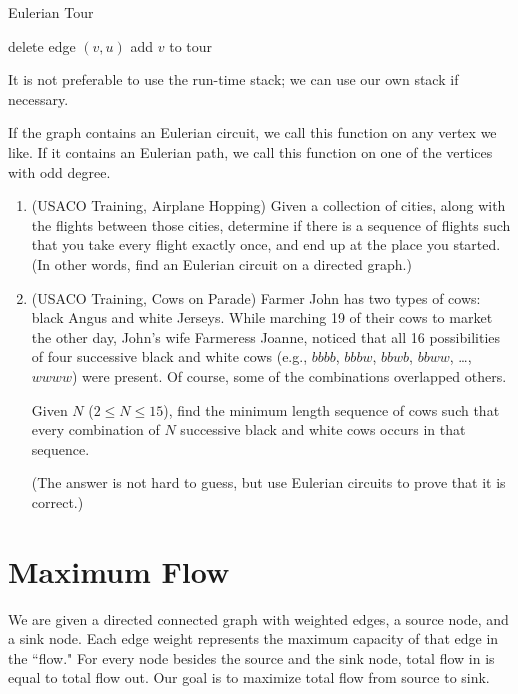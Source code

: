\documentclass[11pt]{book}
\begin{document}
\begin{algorithm}
\caption{Eulerian Tour}
\begin{algorithmic}
	\State delete edge $(v,u)$
	\State {}
\EndWhile
\State add $v$ to tour
\EndFunction
\end{algorithmic}
\end{algorithm}

It is not preferable to use the run-time stack; we can use our own stack if necessary.

If the graph contains an Eulerian circuit, we call this function on any vertex we like. If it contains an Eulerian path, we call this function on one of the vertices with odd degree.

\begin{enumerate}

\item
(USACO Training, Airplane Hopping)
Given a collection of cities, along with the flights between those cities, determine if there is a sequence of flights such that you take every flight exactly once, and end up at the place you started. (In other words, find an Eulerian circuit on a directed graph.)

\item
(USACO Training, Cows on Parade)
Farmer John has two types of cows: black Angus and white Jerseys. While marching 19 of their cows to market the other day, John's wife Farmeress Joanne, noticed that all 16 possibilities of four successive black and white cows (e.g., $bbbb$, $bbbw$, $bbwb$, $bbww$, \ldots, $wwww$) were present. Of course, some of the combinations overlapped others.

Given $N$ ($2 \le N \le 15$), find the minimum length sequence of cows such that every combination of $N$ successive black and white cows occurs in that sequence.

(The answer is not hard to guess, but use Eulerian circuits to prove that it is correct.)

\end{enumerate}

\section{Maximum Flow}

We are given a directed connected graph with weighted edges, a source node, and a sink node. Each edge weight represents the maximum capacity of that edge in the ``flow." For every node besides the source and the sink node, total flow in is equal to total flow out. Our goal is to maximize total flow from source to sink.
\end{document}
